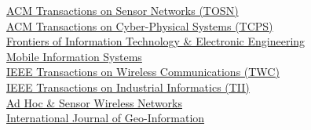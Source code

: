 {\href{http://tosn.acm.org/}{ACM Transactions on Sensor Networks (TOSN)}} \\
{\href{http://tcps.acm.org/}{ACM Transactions on Cyber-Physical Systems (TCPS)}} \\
{\href{http://www.springer.com/computer/journal/11714}{Frontiers of Information Technology \& Electronic Engineering}} \\
{\href{https://www.hindawi.com/journals/misy/}{Mobile Information Systems}} \\
{\href{http://www.comsoc.org/twc}{IEEE Transactions on Wireless Communications (TWC)}} \\
{\href{http://www.ieee-ies.org/pubs/transactions-on-industrial-informatics}{IEEE Transactions on Industrial Informatics (TII)}} \\
{\href{http://www.oldcitypublishing.com/AHSWN/AHSWN.html}{Ad Hoc \& Sensor Wireless Networks}} \\
{\href{http://www.mdpi.com/journal/ijgi}{International Journal of Geo-Information}} \\
